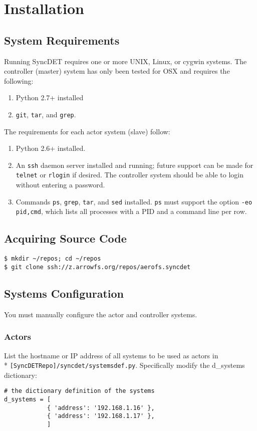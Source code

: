 \section{Installation}

\subsection{System Requirements}

Running SyncDET requires one or more UNIX, Linux, or cygwin systems. 
The controller (master) system has only been tested for OSX and requires the
following:
\begin{enumerate}
\item Python 2.7+ installed
\item {\tt git}, {\tt tar}, and {\tt grep}.
\end{enumerate}
The requirements for each actor system (slave) follow:
\begin{enumerate}
\item Python 2.6+ installed.
\item An {\tt ssh} daemon server installed and running; future support can be made for
{\tt telnet} or {\tt rlogin} if desired. The controller system should be able to login
without entering a password.
\item Commands {\tt ps}, {\tt grep}, {\tt tar}, and {\tt sed} installed. {\tt ps} must
support the option {\tt -eo pid,cmd}, which lists all processes with a PID and a
command line per row.
\end{enumerate}

\subsection{Acquiring Source Code}
\begin{verbatim}
$ mkdir ~/repos; cd ~/repos
$ git clone ssh://z.arrowfs.org/repos/aerofs.syncdet
\end{verbatim}

\subsection{Systems Configuration}
You must manually configure the actor and controller systems. 

\subsubsection{Actors} 
List the hostname or IP address of all systems to be used as actors in \\*
{\tt [SyncDETRepo]/syncdet/systemsdef.py}. Specifically modify the d\_systems
dictionary:
\begin{verbatim}
# the dictionary definition of the systems
d_systems = [
            { 'address': '192.168.1.16' },
            { 'address': '192.168.1.17' },
            ]
\end{verbatim}

